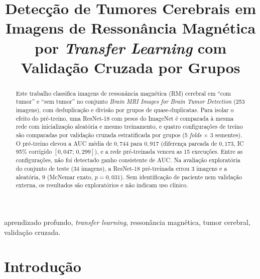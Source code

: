 \documentclass[conference]{IEEEtran}
\begin{document}
\title{Detecção de Tumores Cerebrais em Imagens de Ressonância Magnética por \textit{Transfer Learning} com Validação Cruzada por Grupos}

\author{
\and
{}
}

\maketitle

\begin{abstract}
Este trabalho classifica imagens de ressonância magnética (RM) cerebral em ``com tumor'' e ``sem tumor'' no conjunto \textit{Brain MRI Images for Brain Tumor Detection} (253 imagens), com deduplicação e divisão por grupos de quase-duplicatas. Para isolar o efeito do pré-treino, uma ResNet-18 com pesos do ImageNet é comparada à mesma rede com inicialização aleatória e mesmo treinamento, e quatro configurações de treino são comparadas por validação cruzada estratificada por grupos (5 \textit{folds} $\times$ 3 sementes). O pré-treino elevou a AUC média de $0{,}744$ para $0{,}917$ (diferença pareada de $0{,}173$, IC 95\% corrigido $[0{,}047;\,0{,}299]$), e a rede pré-treinada venceu as 15 execuções. Entre as configurações, não foi detectado ganho consistente de AUC. Na avaliação exploratória do conjunto de teste (34 imagens), a ResNet-18 pré-treinada errou 3 imagens e a aleatória, 9 (McNemar exato, $p=0{,}031$). Sem identificação de paciente nem validação externa, os resultados são exploratórios e não indicam uso clínico.
\end{abstract}

\begin{IEEEkeywords}
aprendizado profundo, \textit{transfer learning}, ressonância magnética, tumor cerebral, validação cruzada.
\end{IEEEkeywords}

\section{Introdução}
\end{document}
